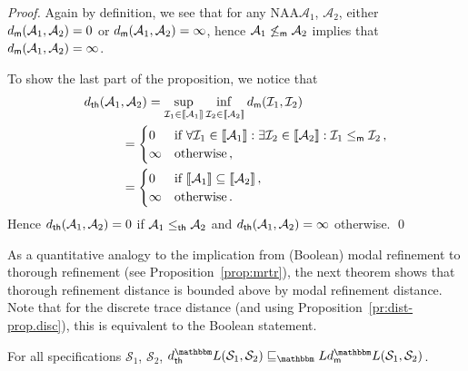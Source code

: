 \documentclass[twocolumn]{svjour3-dummy}
\newcommand*\cI{\mathcal I}
\newcommand*\NAA{NAA\xspace}
\newcommand*\mr{\le_\textup{\textsf{m}}}
\newcommand*\tr{\le_\textup{\textsf{th}}}
\newcommand*\cA{\mathcal A}
\newcommand*\sem[1]{\llbracket #1\rrbracket}
\newcommand*\cS{\mathcal S}
\newcommand*\LL{\mathbbm L}
\newcommand*\md{d_\textup{\textsf{m}}} \newcommand*\mdl{\smash{\md^\LL}}
\newcommand*\thd{d_\textup{\textsf{th}}} \newcommand*\thdl{\thd^\LL}
\begin{document}
\begin{proof}
  Again by definition, we see that for any \NAA $\cA_1$, $\cA_2$, either
  $\md( \cA_1, \cA_2)= 0$ or $\md( \cA_1, \cA_2)= \infty$, hence
  $\cA_1\not\mr \cA_2$ implies that $\md( \cA_1, \cA_2)= \infty$.

  To show the last part of the proposition, we notice that
  \begin{align*}
    \thd( \cA_1, \cA_2) &= \adjustlimits \sup_{ \cI_1\in \sem{ \cA_1}}
    \inf_{ \cI_2\in \sem{ \cA_2}} \md( \cI_1, \cI_2) \\
    &\hspace*{-2em}=
    \begin{cases}
      0 &\text{if } \forall \cI_1\in \sem{ \cA_1}: \exists \cI_2\in
      \sem{ \cA_2}: \cI_1\mr \cI_2\,, \\
      \infty &\text{otherwise}\,,
    \end{cases} \\
    &\hspace*{-2em}=
    \begin{cases}
      0 &\text{if } \sem{ \cA_1}\subseteq \sem{ \cA_2}\,, \\
      \infty &\text{otherwise}\,.
    \end{cases}
  \end{align*}
  Hence $\thd( \cA_1, \cA_2)= 0$ if $\cA_1\tr \cA_2$ and $\thd( \cA_1,
  \cA_2)= \infty$ otherwise.  \qed
\end{proof}

As a quantitative analogy to the implication from (Boolean) modal
refinement to thorough refinement (see Proposition~\ref{prop:mrtr}), the
next theorem shows that thorough refinement distance is bounded above by
modal refinement distance.  Note that for the discrete trace distance
(and using Proposition~\ref{pr:dist-prop.disc}), this is equivalent to
the Boolean statement.

\begin{theorem}
  \label{th:mdl-vs-tdl}
  For all specifications $\cS_1$, $\cS_2$, $\thdl( \cS_1,
  \cS_2)\sqsubseteq_\LL \mdl( \cS_1, \cS_2)$.
\end{theorem}
\end{document}
